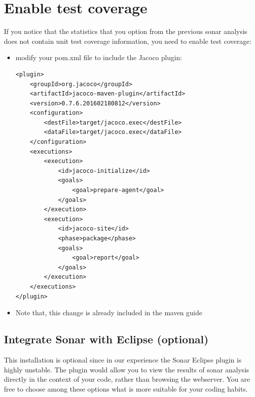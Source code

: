 \documentclass{article}
\newif\ifinstall
\begin{document}
\ifinstall
\else
\section{Enable test coverage}
If you notice that the statistics that you option from the previous
sonar analysis does not contain unit test coverage information, you
need to enable test coverage:

\begin{itemize}
\item modify your pom.xml file to include the Jacoco plugin:
\begin{lstlisting}
<plugin>
	<groupId>org.jacoco</groupId>
	<artifactId>jacoco-maven-plugin</artifactId>
	<version>0.7.6.201602180812</version>
	<configuration>
		<destFile>target/jacoco.exec</destFile>
		<dataFile>target/jacoco.exec</dataFile>
	</configuration>
	<executions>
		<execution>
			<id>jacoco-initialize</id>
			<goals>
				<goal>prepare-agent</goal>
			</goals>
		</execution>
		<execution>
			<id>jacoco-site</id>
			<phase>package</phase>
			<goals>
				<goal>report</goal>
			</goals>
		</execution>
	</executions>
</plugin>
\end{lstlisting}
\item Note that, this change is already included in the maven guide

\end{itemize}

\fi

\subsection{Integrate Sonar with Eclipse (optional)}

This installation is optional since in our experience the Sonar
Eclipse plugin is highly unstable. The plugin would allow you to view
the results of sonar analysis directly in the context of your code,
rather than browsing the webserver. You are free to choose among these
options what is more suitable for your coding habits. 
\end{document}
